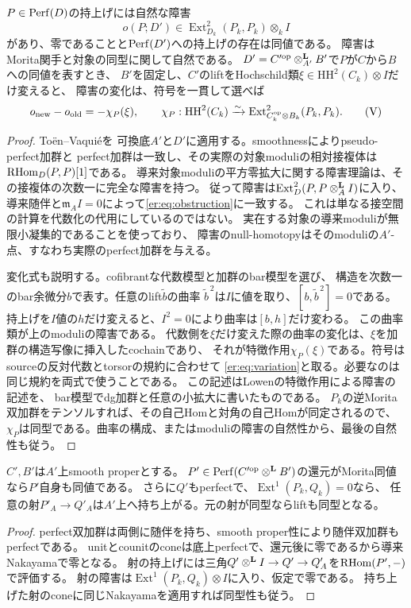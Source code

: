 \begin{lemma}[加群の完全な障害理論と特徴作用]\label{er:lem:obstruction}
$P\in\operatorname{Perf}(D)$の持上げには自然な障害
\[
 o(P;D')\in\operatorname{Ext}^2_{D_k}(P_k,P_k)\otimes_k I
 \tag{O}\label{er:eq:obstruction}
\]
があり、零であることと$\operatorname{Perf}(D')$への持上げの存在は同値である。
障害はMorita関手と対象の同型に関して自然である。
$D'=C'^{\rm op}\otimes^{\mathbf L}_{A'}B'$で$P$が$C$から$B$への同値を表すとき、
$B'$を固定し、$C'$のliftをHochschild類$\xi\in\mathrm{HH}^2(C_k)\otimes I$だけ変えると、
障害の変化は、符号を一貫して選べば
\[
 o_{\rm new}-o_{\rm old}=-\chi_P(\xi),\qquad
 \chi_P:\mathrm{HH}^2(C_k)\xrightarrow{\sim}
       \operatorname{Ext}^2_{C_k^{\rm op}\otimes B_k}(P_k,P_k).
 \tag{V}\label{er:eq:variation}
\]
\end{lemma}
\begin{proof}
Toën--Vaquié\cite[Theorem 3.6, Corollaries 3.15, 3.17]{TV}を
可換底$A'$と$D'$に適用する。smoothnessによりpseudo-perfect加群と
perfect加群は一致し、その実際の対象moduliの相対接複体は$\operatorname{RHom}_D(P,P)[1]$である。
導来対象moduliの平方零拡大に関する障害理論は、その接複体の次数一に完全な障害を持つ。
従って障害は$\operatorname{Ext}^2_D(P,P\otimes^{\mathbf L}_A I)$に入り、
導来随伴と$\mathfrak m_A I=0$によって\eqref{er:eq:obstruction}に一致する。
これは単なる接空間の計算を代数化の代用にしているのではない。
実在する対象の導来moduliが無限小凝集的であることを使っており、
障害のnull-homotopyはそのmoduliの$A'$-点、すなわち実際のperfect加群を与える。

変化式も説明する。cofibrantな代数模型と加群のbar模型を選び、
構造を次数一のbar余微分$b$で表す。任意のlift$\widetilde b$の曲率
$\widetilde b^{\,2}$は$I$に値を取り、$[b,\widetilde b^{\,2}]=0$である。
持上げを$I$値の$h$だけ変えると、$I^2=0$により曲率は$[b,h]$だけ変わる。
この曲率類が上のmoduliの障害である。
代数側を$\xi$だけ変えた際の曲率の変化は、$\xi$を加群の構造写像に挿入したcochainであり、
それが特徴作用$\chi_P(\xi)$である。符号はsourceの反対代数とtorsorの規約に合わせて
\eqref{er:eq:variation}と取る。必要なのは同じ規約を両式で使うことである。
この記述はLowen\cite[Theorem 4.8]{ERLowen}の特徴作用による障害の記述を、
bar模型でdg加群と任意の小拡大に書いたものである。
$P_k$の逆Morita双加群をテンソルすれば、その自己Homと対角の自己Homが同定されるので、
$\chi_P$は同型である。曲率の構成、またはmoduliの障害の自然性から、最後の自然性も従う。
\end{proof}

\begin{lemma}[還元後の同値とintertwiner]\label{er:lem:lift}
$C',B'$は$A'$上smooth properとする。
$P'\in\operatorname{Perf}(C'^{\rm op}\otimes^{\mathbf L} B')$の還元がMorita同値なら$P'$自身も同値である。
さらに$Q'$もperfectで、$\operatorname{Ext}^1(P_k,Q_k)=0$なら、
任意の射$P'_A\to Q'_A$は$A'$上へ持ち上がる。元の射が同型ならliftも同型となる。
\end{lemma}
\begin{proof}
perfect双加群は両側に随伴を持ち、smooth proper性により随伴双加群もperfectである。
unitとcounitのconeは底上perfectで、還元後に零であるから導来Nakayamaで零となる。
射の持上げには三角$Q'\otimes^{\mathbf L} I\to Q'\to Q'_A$を$\operatorname{RHom}(P',-)$で評価する。
射の障害は$\operatorname{Ext}^1(P_k,Q_k)\otimes I$に入り、仮定で零である。
持ち上げた射のconeに同じNakayamaを適用すれば同型性も従う。
\end{proof}

